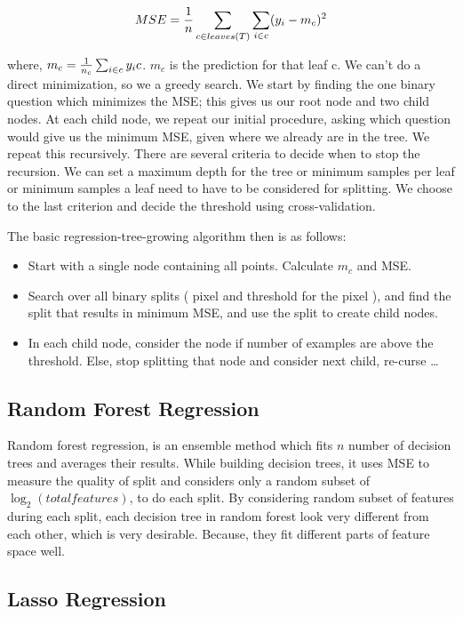 \documentclass[10pt]{article}
\begin{document}
$$MSE = {1 \over n}  \sum_{c \in leaves(T)} \sum_{i \in c} (y_i - m_c)^2$$

where, $m_c =  {1 \over n_c} \sum_{i \in c} y_ic$. $m_c$ is the prediction for that leaf c. We can't do a direct minimization, so we a greedy search. We start by finding the one binary question which minimizes the MSE; this gives us our root node and two child nodes. At each child node, we repeat our initial procedure, asking which question would give us the minimum MSE, given where we already are in the tree. We repeat this recursively. There are several criteria to decide when to stop the recursion. We can set a maximum depth for the tree or minimum samples per leaf or minimum samples a leaf need to have to be considered for splitting. We choose to the last criterion and decide the threshold using cross-validation.

The basic regression-tree-growing algorithm then is as follows:

\begin{itemize}
  \item Start with a single node containing all points. Calculate $m_c$ and MSE.
  \item Search over all binary splits ( pixel and threshold for the pixel ), and find the split that results in minimum MSE, and use the split to create child nodes.
  \item In each child node, consider the node if number of examples are above the threshold. Else, stop splitting that node and consider next child, re-curse \ldots
\end{itemize}

\subsection*{Random Forest Regression} 

Random forest regression, is an ensemble method which fits $n$ number of decision trees and averages their results. While building decision trees, it uses MSE to measure the quality of split and considers only a random subset of $ \log_2(total features)$, to do each split. By considering random subset of features during each split, each decision tree in random forest look very different from each other, which is very desirable. Because, they fit different parts of feature space well.  

\subsection*{Lasso Regression}
\end{document}
